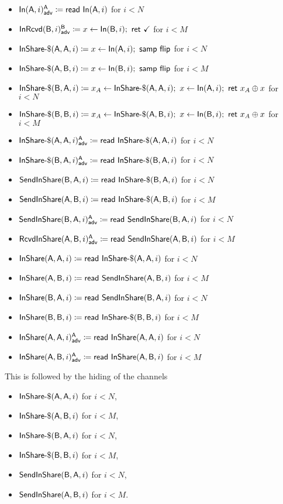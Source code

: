 \begin{itemize}
\item {\color{blue} $\LeakIn(\A,i)^\A_\adv \coloneqq \read{\In(\A,i)}$ for $i < N$}
\item {\color{blue} $\LeakInRcvd(\B,i)^\B_\adv \coloneqq x \leftarrow \In(\B,i); \ \ret{\checkmark}$ for $i < M$}
\item $\InShareGen(\A,\A,i) \coloneqq x \leftarrow \In(\A,i); \ \samp{\flip}$ for $i < N$
\item $\InShareGen(\A,\B,i) \coloneqq x \leftarrow \In(\B,i); \ \samp{\flip}$ for $i < M$
\item $\InShareGen(\B,\A,i) \coloneqq x_A \leftarrow \InShareGen(\A,\A,i); \ x \leftarrow \In(\A,i); \ \ret{x_A \oplus x}$ for $i < N$
\item $\InShareGen(\B,\B,i) \coloneqq x_A \leftarrow \InShareGen(\A,\B,i); \ x \leftarrow \In(\B,i); \ \ret{x_A \oplus x}$ for $i < M$
\item {\color{blue} $\LeakInShareGen(\A,\A,i)^\A_\adv \coloneqq \read{\InShareGen(\A,\A,i)}$ for $i < N$}
\item {\color{blue} $\LeakInShareGen(\B,\A,i)^\A_\adv \coloneqq \read{\InShareGen(\B,\A,i)}$ for $i < N$}
\item $\SendInShare(\B,\A,i) \coloneqq \read{\InShareGen(\B,\A,i)}$ for $i < N$
\item $\SendInShare(\A,\B,i) \coloneqq \read{\InShareGen(\A,\B,i)}$ for $i < M$
\item {\color{blue} $\LeakSendInShare(\B,\A,i)^\A_\adv \coloneqq \read{\SendInShare(\B,\A,i)}$ for $i < N$}
\item {\color{blue} $\LeakRcvdInShare(\A,\B,i)^\A_\adv \coloneqq \read{\SendInShare(\A,\B,i)}$ for $i < M$}
\item $\InShare(\A,\A,i) \coloneqq \read{\InShareGen(\A,\A,i)}$ for $i < N$
\item $\InShare(\A,\B,i) \coloneqq \read{\SendInShare(\A,\B,i)}$ for $i < M$
\item $\InShare(\B,\A,i) \coloneqq \read{\SendInShare(\B,\A,i)}$ for $i < N$
\item $\InShare(\B,\B,i) \coloneqq \read{\InShareGen(\B,\B,i)}$ for $i < M$
\item {\color{blue} $\LeakInShare(\A,\A,i)^\A_\adv \coloneqq \read{\InShare(\A,\A,i)}$ for $i < N$}
\item {\color{blue} $\LeakInShare(\A,\B,i)^\A_\adv \coloneqq \read{\InShare(\A,\B,i)}$ for $i < M$}
\end{itemize}
This is followed by the hiding of the channels
\begin{itemize}
\item $\InShareGen(\A,\A,i)$ for $i < N$,
\item $\InShareGen(\A,\B,i)$ for $i < M$,
\item $\InShareGen(\B,\A,i)$ for $i < N$,
\item $\InShareGen(\B,\B,i)$ for $i < M$,
\item $\SendInShare(\B,\A,i)$ for $i < N$,
\item $\SendInShare(\A,\B,i)$ for $i < M$.
\end{itemize}

